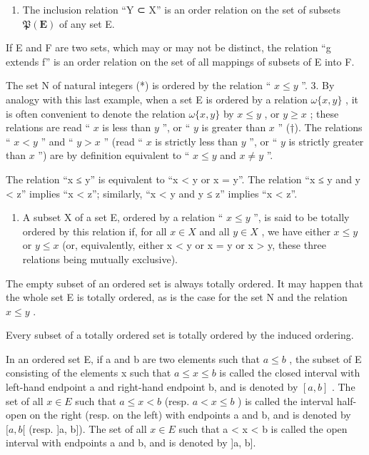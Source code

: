 \begin{enumerate}
\def\labelenumi{\arabic{enumi}.}
\setcounter{enumi}{1}
\tightlist
\item
  The inclusion relation ``Y ⊂ X'' is an order relation on the set of subsets \(\mathfrak{P}(\mathbf{E})\) of any set E.
\end{enumerate}

If E and F are two sets, which may or may not be distinct, the relation ``g extends f'' is an order relation on the set of all mappings of subsets of E into F.

The set N of natural integers (*) is ordered by the relation `` \(x \leqslant y\) ''. 3. By analogy with this last example, when a set E is ordered by a relation \(\omega\{x, y\}\) , it is often convenient to denote the relation \(\omega\{x, y\}\) by \(x \leqslant y\) , or \(y \geqslant x\) ; these relations are read `` \(x\) is less than \(y\) '', or `` \(y\) is greater than \(x\) '' (†). The relations `` \(x < y\) '' and `` \(y > x\) '' (read `` \(x\) is strictly less than \(y\) '', or `` \(y\) is strictly greater than \(x\) '') are by definition equivalent to `` \(x \leqslant y\) and \(x \neq y\) ''.

The relation ``x ≤ y'' is equivalent to ``x \textless{} y or x = y''. The relation ``x ≤ y and y \textless{} z'' implies ``x \textless{} z''; similarly, ``x \textless{} y and y ≤ z'' implies ``x \textless{} z''.

\begin{enumerate}
\def\labelenumi{\arabic{enumi}.}
\setcounter{enumi}{3}
\tightlist
\item
  A subset X of a set E, ordered by a relation `` \(x \leqslant y\) '', is said to be totally ordered by this relation if, for all \(x \in X\) and all \(y \in X\) , we have either \(x \leqslant y\) or \(y \leqslant x\) (or, equivalently, either x \textless{} y or x = y or x \textgreater{} y, these three relations being mutually exclusive).
\end{enumerate}

The empty subset of an ordered set is always totally ordered. It may happen that the whole set E is totally ordered, as is the case for the set N and the relation \(x \leqslant y\) .

Every subset of a totally ordered set is totally ordered by the induced ordering.

In an ordered set E, if a and b are two elements such that \(a \leqslant b\) , the subset of E consisting of the elements x such that \(a \leqslant x \leqslant b\) is called the closed interval with left-hand endpoint a and right-hand endpoint b, and is denoted by \([a, b]\) . The set of all \(x \in E\) such that \(a \leqslant x < b\) (resp. \(a < x \leqslant b\) ) is called the interval half-open on the right (resp. on the left) with endpoints a and b, and is denoted by \([a, b[\) (resp. {]}a, b{]}). The set of all \(x \in E\) such that a \textless{} x \textless{} b is called the open interval with endpoints a and b, and is denoted by {]}a, b{]}.

